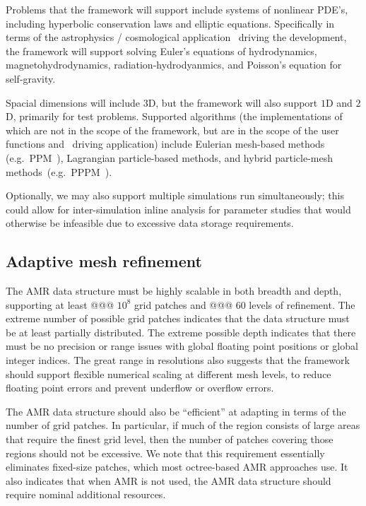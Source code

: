 \documentclass[10pt,twocolumn]{article}
\begin{document}
Problems that the framework will support include systems of nonlinear
PDE's, including hyperbolic conservation laws and elliptic equations.
Specifically in terms of the astrophysics / cosmological application
\enzoii\ driving the development, the framework will support solving
Euler's equations of hydrodynamics, magnetohydrodynamics,
radiation-hydrodyanmics, and Poisson's equation for self-gravity.

Spacial dimensions will include $3$D, but the framework will also
support $1$D and $2$D, primarily for test problems.  Supported
algorithms (the implementations of which are not in the scope of the
framework, but are in the scope of the user functions and \enzoii\
driving application) include Eulerian mesh-based methods
(e.g.~PPM~\cite{WoCo84b}), Lagrangian particle-based methods, and
hybrid particle-mesh methods~(e.g.~PPPM~\cite{HoEa88}).

Optionally, we may also support multiple simulations run
simultaneously; this could allow for inter-simulation inline analysis
for parameter studies that would otherwise be infeasible due to
excessive data storage requirements.


\subsection{Adaptive mesh refinement} \label{ss:require-amr}

The AMR data structure must be highly scalable in both breadth and
depth, supporting at least @@@ $10^8$ grid patches and @@@ $60$ levels
of refinement.  The extreme number of possible grid patches indicates
that the data structure must be at least partially distributed.  The
extreme possible depth indicates that there must be no precision or
range issues with global floating point positions or global integer
indices.  The great range in resolutions also suggests that the
framework should support flexible numerical scaling at different mesh
levels, to reduce floating point errors and prevent underflow or
overflow errors.

The AMR data structure should also be ``efficient'' at adapting in
terms of the number of grid patches.  In particular, if much of the
region consists of large areas that require the finest grid level,
then the number of patches covering those regions should not be
excessive.  We note that this requirement essentially eliminates
fixed-size patches, which most octree-based AMR approaches use.  It
also indicates that when AMR is not used, the AMR data structure should
require nominal additional resources.
\end{document}
